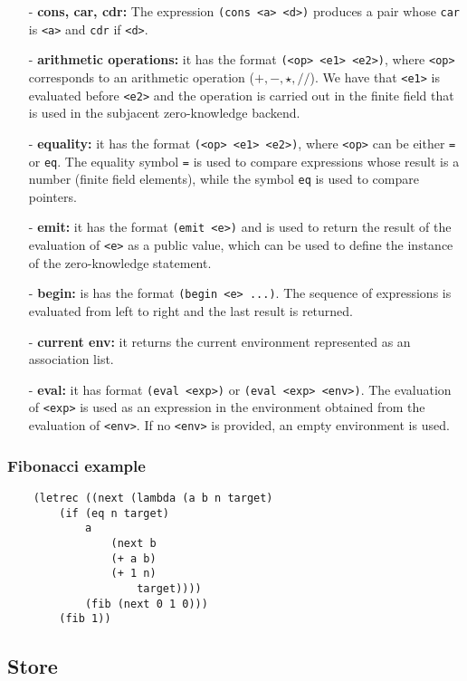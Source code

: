 \documentclass[10pt, english]{article}
\begin{document}
\begin{itemize}
  \item[-] \textbf{cons, car, cdr:} The expression \verb|(cons <a> <d>)| produces a pair whose \verb|car| is \verb|<a>| and \verb|cdr| if \verb|<d>|.
  \item[-] \textbf{arithmetic operations:} it has the format \verb|(<op> <e1> <e2>)|, where \verb|<op>| corresponds to an arithmetic operation ($+, -, \star, //$). We have that \verb|<e1>| is evaluated before \verb|<e2>| and the operation is carried out in the finite field that is used in the subjacent zero-knowledge backend.
  \item[-] \textbf{equality:} it has the format \verb|(<op> <e1> <e2>)|, where \verb|<op>| can be either \verb|=| or \verb|eq|. The equality symbol \verb|=| is used to compare expressions whose result is a number (finite field elements), while the symbol \verb|eq| is used to compare pointers.
  \item[-] \textbf{emit:} it has the format \verb|(emit <e>)| and is used to return the result of the evaluation of \verb|<e>| as a public value, which can be used to define the instance of the zero-knowledge statement.
  \item[-] \textbf{begin:} is has the format \verb|(begin <e> ...)|. The sequence of expressions is evaluated from left to right and the last result is returned.
  \item[-] \textbf{current env:} it returns the current environment represented as an association list.
  \item[-] \textbf{eval:} it has format \verb|(eval <exp>)| or \verb|(eval <exp> <env>)|. The evaluation of \verb|<exp>| is used as an expression in the environment obtained from the evaluation of \verb|<env>|. If no \verb|<env>| is provided, an empty environment is used.
\end{itemize}

\subsubsection{Fibonacci example}

\begin{verbatim}
    (letrec ((next (lambda (a b n target)
        (if (eq n target)
            a
                (next b
                (+ a b)
                (+ 1 n)
                    target))))
            (fib (next 0 1 0)))
        (fib 1))
\end{verbatim}

\subsection{Store}
\end{document}
